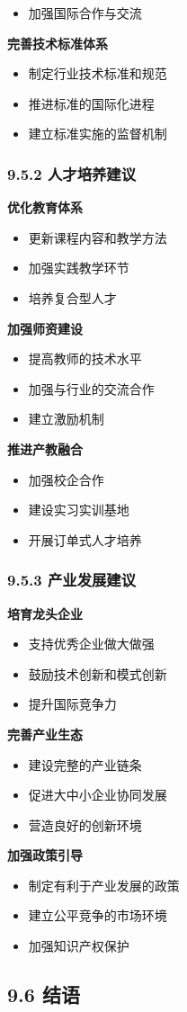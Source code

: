 \begin{itemize}
建立技术创新联盟 \item 加强国际合作与交流 \end{itemize} \textbf{完善技术标准体系} \begin{itemize} \tightlist \item 制定行业技术标准和规范 \item 推进标准的国际化进程
\item 建立标准实施的监督机制 \end{itemize} \subsubsection{9.5.2 人才培养建议}\label{ux4ebaux624dux57f9ux517bux5efaux8bae} \textbf{优化教育体系}
\begin{itemize} \tightlist \item 更新课程内容和教学方法 \item 加强实践教学环节 \item 培养复合型人才 \end{itemize} \textbf{加强师资建设} \begin{itemize}
\tightlist \item 提高教师的技术水平 \item 加强与行业的交流合作 \item 建立激励机制 \end{itemize} \textbf{推进产教融合} \begin{itemize} \tightlist \item
加强校企合作 \item 建设实习实训基地 \item 开展订单式人才培养 \end{itemize} \subsubsection{9.5.3
产业发展建议}\label{ux4ea7ux4e1aux53d1ux5c55ux5efaux8bae} \textbf{培育龙头企业} \begin{itemize} \tightlist \item 支持优秀企业做大做强 \item
鼓励技术创新和模式创新 \item 提升国际竞争力 \end{itemize} \textbf{完善产业生态} \begin{itemize} \tightlist \item 建设完整的产业链条 \item 促进大中小企业协同发展
\item 营造良好的创新环境 \end{itemize} \textbf{加强政策引导} \begin{itemize} \tightlist \item 制定有利于产业发展的政策 \item 建立公平竞争的市场环境 \item
加强知识产权保护 \end{itemize} \subsection{9.6 结语}\label{ux7ed3ux8bed-1}
